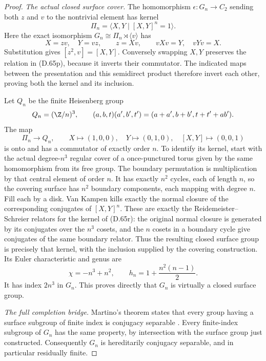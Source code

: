 \begin{proof}
\emph{The actual closed surface cover.}
The homomorphism
$\epsilon:G_n\to C_2$ sending both $z$ and $v$
to the nontrivial element has kernel
\[
           \Pi_n=\langle X,Y\mid [X,Y]^n=1\rangle.
                                                               \tag{D.65p}
\]
Here the exact isomorphism
$G_n\cong\Pi_n\rtimes\langle v\rangle$ has
\[
         X=zv,\quad Y=vz,\qquad
         z=Xv,\qquad vXv=Y,\quad vYv=X.
                                                               \tag{D.65q}
\]
Substitution gives $[z^2,v]=[X,Y]$.
Conversely swapping $X,Y$ preserves the relation
in (D.65p), because it inverts their commutator.
The indicated maps between the presentation and
this semidirect product therefore invert each other,
proving both the kernel and its inclusion.

Let $Q_n$ be the finite Heisenberg group
\[
 Q_n=(\Z/n)^3,\qquad
 (a,b,t)(a',b',t')=(a+a',b+b',t+t'+ab').
\]
The map
\[
  \Pi_n\longrightarrow Q_n,\qquad
    X\longmapsto(1,0,0),\quad
    Y\longmapsto(0,1,0),\quad
    [X,Y]\longmapsto(0,0,1)                                  \tag{D.65r}
\]
is onto and has a commutator of exactly order $n$.
To identify its kernel, start with the actual
degree-$n^3$ regular cover of a once-punctured torus
given by the same homomorphism from its free group.
The boundary permutation is multiplication by that
central element of order $n$.
It has exactly $n^2$ cycles, each of length $n$,
so the covering surface has $n^2$ boundary components,
each mapping with degree $n$.
Fill each by a disk.
Van Kampen kills exactly the normal closure of
the corresponding conjugates of $[X,Y]^n$.
These are exactly the Reidemeister--Schreier relators
for the kernel of (D.65r): the original normal
closure is generated by its conjugates over the
$n^3$ cosets, and the $n$ cosets in a boundary
cycle give conjugates of the same boundary relator.
Thus the resulting closed surface group is precisely
that kernel, with the inclusion supplied by the
covering construction.
Its Euler characteristic and genus are
\[
         \chi=-n^3+n^2,\qquad
                    h_n=1+\frac{n^2(n-1)}2 .
                                                               \tag{D.65s}
\]
It has index $2n^3$ in $G_n$.
This proves directly that $G_n$ is virtually a
closed surface group.

\emph{The full completion bridge.}
Martino's theorem states that every group having
a surface subgroup of finite index is conjugacy
separable \cite[Theorem 3.7 of the inspected author
version]{C-Martino2007}.
Every finite-index subgroup of $G_n$ has the same
property, by intersection with the surface group
just constructed.
Consequently $G_n$ is hereditarily conjugacy
separable, and in particular residually finite.


\end{proof}
